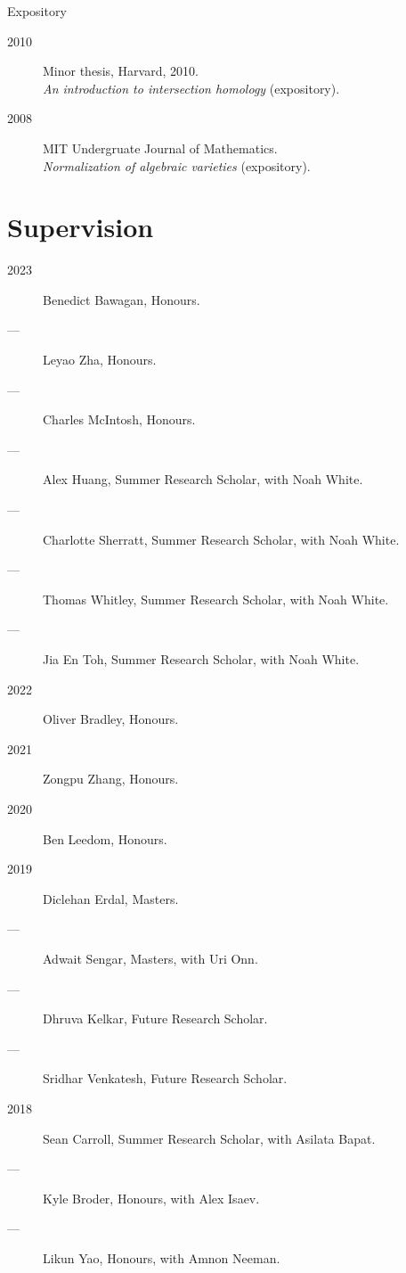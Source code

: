 \documentclass[11pt]{article}
\begin{document}
\begin{description}
\item[{Expository}] 
\end{description}
\label{org9dbfc00}
\begin{description}
\item[{2010}] Minor thesis, Harvard, 2010.\\
\emph{An introduction to intersection homology} (expository).
\item[{2008}] MIT Undergruate Journal of Mathematics.\\
\emph{Normalization of algebraic varieties} (expository).
\end{description}
\section*{Supervision}
\label{sec:org4fd9c30}
\label{org904864c}
\begin{description}
\item[{2023}] Benedict Bawagan, Honours.
\item[{---}] Leyao Zha, Honours.
\item[{---}] Charles McIntosh, Honours.
\item[{---}] Alex Huang, Summer Research Scholar, with Noah White.
\item[{---}] Charlotte Sherratt, Summer Research Scholar, with Noah White.
\item[{---}] Thomas Whitley, Summer Research Scholar, with Noah White.
\item[{---}] Jia En Toh, Summer Research Scholar, with Noah White.
\item[{2022}] Oliver Bradley, Honours.
\item[{2021}] Zongpu Zhang, Honours.
\item[{2020}] Ben Leedom, Honours.
\item[{2019}] Diclehan Erdal, Masters.
\item[{---}] Adwait Sengar, Masters, with Uri Onn.
\item[{---}] Dhruva Kelkar, Future Research Scholar.
\item[{---}] Sridhar Venkatesh, Future Research Scholar.
\item[{2018}] Sean Carroll, Summer Research Scholar, with Asilata Bapat.
\item[{---}] Kyle Broder, Honours, with Alex Isaev.
\item[{---}] Likun Yao, Honours, with Amnon Neeman.
\end{description}
\end{document}
